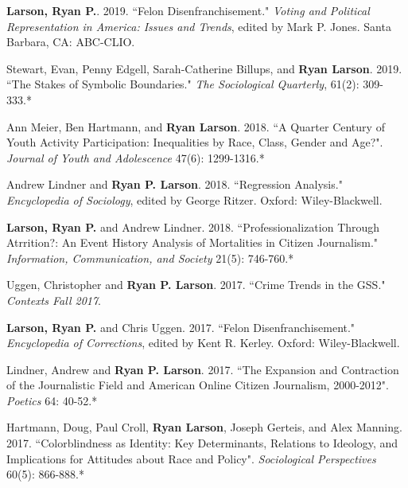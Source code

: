 \documentclass[letterpaper]{article}
\renewenvironment{itemize}{
  \begin{list}{}{
    \setlength{\leftmargin}{1.5em}
  }
}{
  \end{list}
}
\begin{document}
\begin{itemize}
\item \textbf{Larson, Ryan P.}. 2019. ``Felon Disenfranchisement." \textit{Voting and Political Representation in America: Issues and Trends}, edited by Mark P. Jones. Santa Barbara, CA: ABC-CLIO.

\item Stewart, Evan, Penny Edgell, Sarah-Catherine Billups, and \textbf{Ryan Larson}. 2019. ``The Stakes of Symbolic Boundaries."  \textit{The Sociological Quarterly}, 61(2): 309-333.*

\item Ann Meier, Ben Hartmann, and \textbf{Ryan Larson}. 2018.  ``A Quarter Century of Youth Activity Participation: Inequalities by Race, Class, Gender and Age?". \textit{Journal of Youth and Adolescence} 47(6): 1299-1316.*

\item Andrew Lindner and \textbf{Ryan P. Larson}. 2018. ``Regression Analysis." \textit{Encyclopedia of Sociology}, edited by George Ritzer. Oxford: Wiley-Blackwell.

\item \textbf{Larson, Ryan P.} and Andrew Lindner. 2018. ``Professionalization Through Atrrition?: An Event History Analysis of Mortalities in Citizen Journalism."  \textit{Information, Communication, and Society} 21(5): 746-760.*

\item Uggen, Christopher and \textbf{Ryan P. Larson}. 2017.  ``Crime Trends in the GSS." \textit{Contexts Fall 2017}.

\item \textbf{Larson, Ryan P.} and Chris Uggen. 2017. ``Felon Disenfranchisement." \textit{Encyclopedia of Corrections}, edited by Kent R. Kerley. Oxford: Wiley-Blackwell.

\item Lindner, Andrew and \textbf{Ryan P. Larson}. 2017. ``The Expansion and Contraction of the Journalistic Field and American Online Citizen Journalism, 2000-2012". \textit{Poetics} 64: 40-52.*

\item Hartmann, Doug, Paul Croll, \textbf{Ryan Larson}, Joseph Gerteis, and  Alex Manning. 2017. ``Colorblindness as Identity:  Key Determinants, Relations to Ideology, and Implications for Attitudes about Race and Policy". \textit{Sociological Perspectives} 60(5): 866-888.*


\end{itemize}
\end{document}
